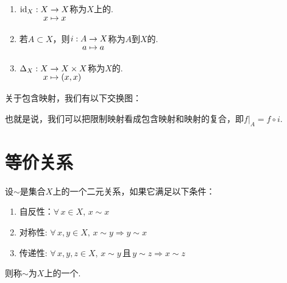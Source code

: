 \begin{definition}[特殊的映射][def:1.9]
    \begin{enumerate}
        \item ${\setjot[-2]\begin{aligned}[t]
            \mathrm{id}_X: X &\to X \\
            x &\mapsto x
        \end{aligned}}$称为$X$上的.
        \item 若$A\subset X$，则${\setjot[-2]\begin{aligned}[t]
            i:A &\to X \\
            a &\mapsto a
        \end{aligned}}$称为$A$到$X$的.
        \item $\setjot[-2]\begin{aligned}[t]
            \Delta_X:X &\to X\times X \\
            x &\mapsto (x,x)
        \end{aligned}$称为$X$的.
    \end{enumerate}
\end{definition}

\begin{remark}
    关于包含映射，我们有以下交换图： \par
    \begin{figure}
        \vspace{-4 em}
        \vspace{-2 em}
    \end{figure}
    \par

也就是说，我们可以把限制映射看成包含映射和映射的复合，即$f|_A=f\circ i$.

\end{remark}

\section{等价关系}

\begin{definition}[等价关系][def:1.10]
    设$\sim$是集合$X$上的一个二元关系，如果它满足以下条件：
    \begin{enumerate}
        \item 自反性：$\forall\, x\in X,\,x\sim x$
        \item 对称性: $\forall\, x,y\in X,\,x\sim y\Rightarrow y\sim x$
        \item 传递性: $\forall\, x,y,z\in X,\,x\sim y\,\text{且}\,y\sim z\Rightarrow x\sim z$
    \end{enumerate}
    则称$\sim$为$X$上的一个.
\end{definition}



